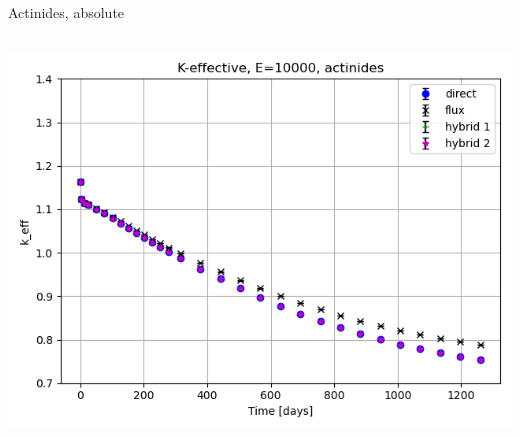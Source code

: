 \documentclass[
	11pt, %
	aspectratio=169, %
]{beamer}
\begin{document}
\begin{frame}{Actinides, absolute}
\begin{columns}[c]
\begin{column}{0.39\textwidth}
			\includegraphics[width=\textwidth]{../figures/keff/keff_actinides_10000.png}
		\end{column}
	\end{columns}
\end{frame}
\end{document}
